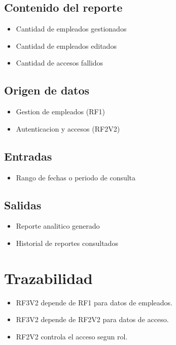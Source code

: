 \documentclass[12pt]{article}
\begin{document}
\subsection{Contenido del reporte}
\begin{itemize}
  \item Cantidad de empleados gestionados
  \item Cantidad de empleados editados
  \item Cantidad de accesos fallidos
\end{itemize}

\subsection{Origen de datos}
\begin{itemize}
  \item Gestion de empleados (RF1)
  \item Autenticacion y accesos (RF2V2)
\end{itemize}

\subsection{Entradas}
\begin{itemize}
  \item Rango de fechas o periodo de consulta
\end{itemize}

\subsection{Salidas}
\begin{itemize}
  \item Reporte analitico generado
  \item Historial de reportes consultados
\end{itemize}

\section{Trazabilidad}
\begin{itemize}
  \item RF3V2 depende de RF1 para datos de empleados.
  \item RF3V2 depende de RF2V2 para datos de acceso.
  \item RF2V2 controla el acceso segun rol.
\end{itemize}
\end{document}

